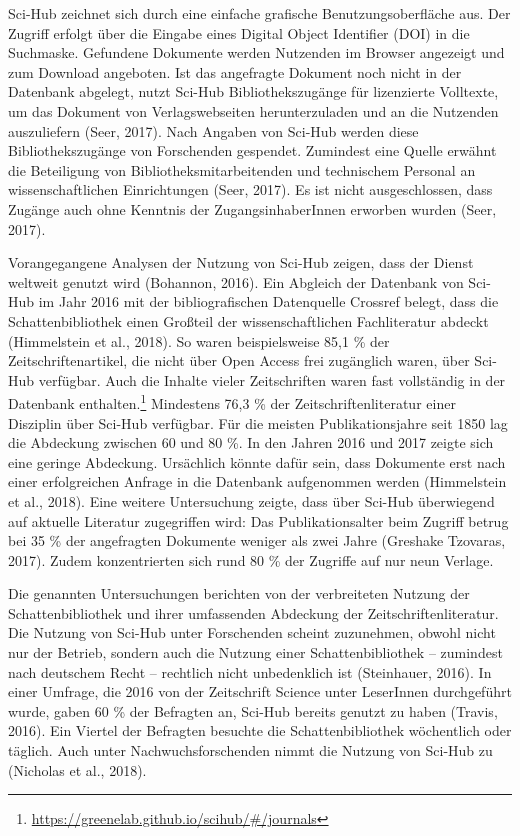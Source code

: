 \documentclass[a4paper,
fontsize=11pt,
oneside,
numbers=noperiodatend,
parskip=half-,
bibliography=totoc,
final
]{scrartcl}
\begin{document}
Sci-Hub zeichnet sich durch eine einfache grafische Benutzungsoberfläche
aus. Der Zugriff erfolgt über die Eingabe eines Digital Object
Identifier (DOI) in die Suchmaske. Gefundene Dokumente werden Nutzenden
im Browser angezeigt und zum Download angeboten. Ist das angefragte
Dokument noch nicht in der Datenbank abgelegt, nutzt Sci-Hub
Bibliothekszugänge für lizenzierte Volltexte, um das Dokument von
Verlagswebseiten herunterzuladen und an die Nutzenden auszuliefern
(Seer, 2017). Nach Angaben von Sci-Hub werden diese Bibliothekszugänge
von Forschenden gespendet. Zumindest eine Quelle erwähnt die Beteiligung
von Bibliotheksmitarbeitenden und technischem Personal an
wissenschaftlichen Einrichtungen (Seer, 2017). Es ist nicht
ausgeschlossen, dass Zugänge auch ohne Kenntnis der ZugangsinhaberInnen
erworben wurden (Seer, 2017).

Vorangegangene Analysen der Nutzung von Sci-Hub zeigen, dass der Dienst
weltweit genutzt wird (Bohannon, 2016). Ein Abgleich der Datenbank von
Sci-Hub im Jahr 2016 mit der bibliografischen Datenquelle Crossref
belegt, dass die Schattenbibliothek einen Großteil der
wissenschaftlichen Fachliteratur abdeckt (Himmelstein et al., 2018). So
waren beispielsweise 85,1 \% der Zeitschriftenartikel, die nicht über
Open Access frei zugänglich waren, über Sci-Hub verfügbar. Auch die
Inhalte vieler Zeitschriften waren fast vollständig in der Datenbank
enthalten.\footnote{\url{https://greenelab.github.io/scihub/\#/journals}}
Mindestens 76,3 \% der Zeitschriftenliteratur einer Disziplin über
Sci-Hub verfügbar. Für die meisten Publikationsjahre seit 1850 lag die
Abdeckung zwischen 60 und 80 \%. In den Jahren 2016 und 2017 zeigte sich
eine geringe Abdeckung. Ursächlich könnte dafür sein, dass Dokumente
erst nach einer erfolgreichen Anfrage in die Datenbank aufgenommen
werden (Himmelstein et al., 2018). Eine weitere Untersuchung zeigte,
dass über Sci-Hub überwiegend auf aktuelle Literatur zugegriffen wird:
Das Publikationsalter beim Zugriff betrug bei 35 \% der angefragten
Dokumente weniger als zwei Jahre (Greshake Tzovaras, 2017). Zudem
konzentrierten sich rund 80 \% der Zugriffe auf nur neun Verlage.

Die genannten Untersuchungen berichten von der verbreiteten Nutzung der
Schattenbibliothek und ihrer umfassenden Abdeckung der
Zeitschriftenliteratur. Die Nutzung von Sci-Hub unter Forschenden
scheint zuzunehmen, obwohl nicht nur der Betrieb, sondern auch die
Nutzung einer Schattenbibliothek -- zumindest nach deutschem Recht --
rechtlich nicht unbedenklich ist (Steinhauer, 2016). In einer Umfrage,
die 2016 von der Zeitschrift Science unter LeserInnen durchgeführt
wurde, gaben 60 \% der Befragten an, Sci-Hub bereits genutzt zu haben
(Travis, 2016). Ein Viertel der Befragten besuchte die
Schattenbibliothek wöchentlich oder täglich. Auch unter
Nachwuchsforschenden nimmt die Nutzung von Sci-Hub zu (Nicholas et al.,
2018).
\end{document}
